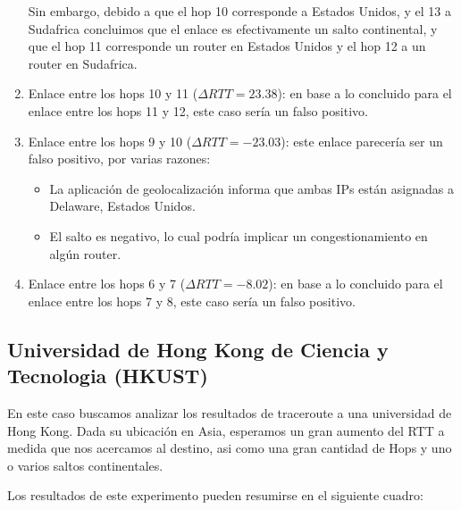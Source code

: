 \begin{enumerate}
    Sin embargo, debido a que el hop 10 corresponde a Estados Unidos, y el 13 a Sudafrica concluimos que el enlace es efectivamente un salto continental, y que el hop 11 corresponde un router en Estados Unidos y el hop 12 a un router en Sudafrica.
  \item Enlace entre los hops 10 y 11 ($\Delta RTT = 23.38$): en base a lo concluido para el enlace entre los hops 11 y 12, este caso sería un falso positivo.
  \item Enlace entre los hops 9 y 10 ($\Delta RTT = -23.03$): este enlace parecería ser un falso positivo, por varias razones:
      \begin{itemize}
        \item La aplicación de geolocalización informa que ambas IPs están asignadas a Delaware, Estados Unidos.
        \item El salto es negativo, lo cual podría implicar un congestionamiento en algún router.
      \end{itemize}
  \item Enlace entre los hops 6 y 7 ($\Delta RTT = -8.02$): en base a lo concluido para el enlace entre los hops 7 y 8, este caso sería un falso positivo.
\end{enumerate}


\subsection{Universidad de Hong Kong de Ciencia y Tecnologia (HKUST)}

En este caso buscamos analizar los resultados de traceroute a una universidad de Hong Kong. Dada su ubicación en Asia, esperamos un gran aumento del RTT a medida que nos acercamos al destino, asi como una gran cantidad de Hops y uno o varios saltos continentales.

Los resultados de este experimento pueden resumirse en el siguiente cuadro:

